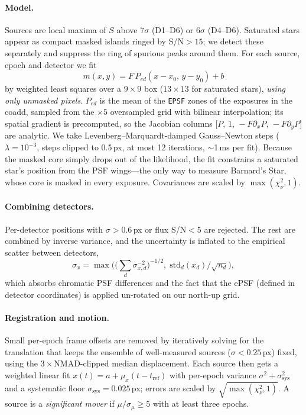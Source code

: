 \documentclass[10pt,twocolumn]{article}
\newcommand{\SN}{S/N}
\newcommand{\chisqnu}{\ensuremath{\chi^2_\nu}}
\begin{document}
\paragraph{Model.} Sources are local maxima of $S$ above $7\sigma$ (D1--D6) or $6\sigma$ (D4--D6).
Saturated stars appear as compact masked islands ringed by \SN{}$>15$; we detect these separately and
suppress the ring of spurious peaks around them. For each source, epoch and detector we fit
\begin{equation}
  m(x,y) = F\,P_{ed}(x-x_0,\,y-y_0) + b
\end{equation}
by weighted least squares over a $9\times9$ box ($13\times13$ for saturated stars), \emph{using only
unmasked pixels}. $P_{ed}$ is the mean of the \texttt{EPSF} zones of the exposures in the coadd, sampled
from the $\times5$ oversampled grid with bilinear interpolation; its spatial gradient is precomputed, so
the Jacobian columns $\big[P,\,1,\,-F\partial_xP,\,-F\partial_yP\big]$ are analytic. We take
Levenberg--Marquardt-damped Gauss--Newton steps ($\lambda=10^{-3}$, steps clipped to 0.5\,px, at most
12 iterations, $\sim$1\,ms per fit). Because the masked core simply drops out of the likelihood, the fit
constrains a saturated star's position from the PSF wings---the only way to measure Barnard's Star, whose
core is masked in every exposure. Covariances are scaled by $\max(\chisqnu,1)$.

\paragraph{Combining detectors.} Per-detector positions with $\sigma>0.6$\,px or flux \SN{}$<5$ are
rejected. The rest are combined by inverse variance, and the uncertainty is inflated to the empirical
scatter between detectors,
\begin{equation}
  \sigma_x = \max\!\Big(\big(\textstyle\sum_d \sigma_{x,d}^{-2}\big)^{-1/2},\;
                         \mathrm{std}_d(x_d)/\sqrt{n_d}\Big),
\end{equation}
which absorbs chromatic PSF differences and the fact that the ePSF (defined in detector coordinates) is
applied un-rotated on our north-up grid.

\paragraph{Registration and motion.} Small per-epoch frame offsets are removed by iteratively solving for
the translation that keeps the ensemble of well-measured sources ($\sigma<0.25$\,px) fixed, using the
$3\times$NMAD-clipped median displacement. Each source then gets a weighted linear fit
$x(t)=a+\mu_x(t-t_\mathrm{ref})$ with per-epoch variance $\sigma^2+\sigma_\mathrm{sys}^2$ and a systematic
floor $\sigma_\mathrm{sys}=0.025$\,px; errors are scaled by $\sqrt{\max(\chisqnu,1)}$. A source is a
\emph{significant mover} if $\mu/\sigma_\mu\geq5$ with at least three epochs.
\end{document}
